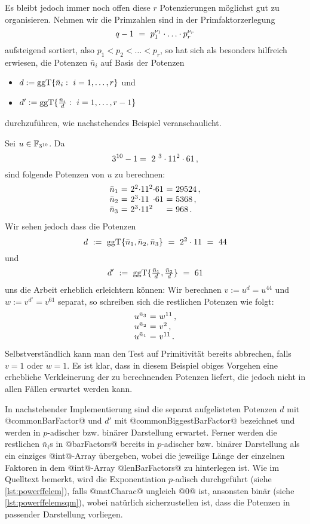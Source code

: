 Es bleibt jedoch immer noch offen diese $r$ Potenzierungen möglichst gut
zu organisieren. Nehmen wir die Primzahlen sind in der Primfaktorzerlegung
\[ q-1 \ =\  p_1^{\nu_1}\cdot\ldots\cdot p_r^{\nu_r}\]
aufsteigend sortiert, also $p_1<p_2<\ldots < p_r$, so
hat sich als besonders hilfreich erwiesen, die Potenzen $\bar n_i$ auf
Basis der Potenzen
\begin{itemize}
  \item $d := \ggT\{ \bar n_i:\ i=1,\ldots,r\}$ und 
  \item $d' := \ggT\{ \frac{\bar n_i}{d}:\ i=1,\ldots,r-1\}$
\end{itemize}
durchzuführen, wie nachstehendes Beispiel veranschaulicht.

\begin{beispiel}
  Sei $u \in \mathbb{F}_{3^{10}}$. Da
  \[ 3^{10}-1 = \ 2\ ^{3} \cdot 11^{2} \cdot 61 \,,\]
  sind folgende Potenzen von $u$ zu berechnen:
  \[ \begin{array}{l@{\ =\ }l@{}l@{}l@{\ =\ }l}
    \bar n_1 & 2^2 \cdot & 11^2 & \cdot 61 & 29524\,,\\
    \bar n_2 & 2^3 \cdot & 11 & \cdot 61 & 5368\,,\\
    \bar n_3 & 2^3 \cdot & 11^2 && 968\,. \end{array} \]
  Wir sehen jedoch dass die Potenzen
  \[ d \ :=\  \operatorname{ggT}\{ \bar n_1,\bar n_2,\bar n_3\} 
    \ =\  2^2\cdot 11 \ =\  44 \]
  und 
  \[ d' \ :=\  \operatorname{ggT}\{ \tfrac{\bar n_1}{d},\tfrac{\bar n_2}{d}\} \ =\  61\]
  uns die Arbeit erheblich erleichtern können:
  Wir berechnen $v := u^d = u^{44}$ und 
  $w := v^{d'} = v^{61}$ separat, so schreiben sich die restlichen Potenzen wie
  folgt:
  \[ \begin{array}{l@{\ =\ }l}
    u^{\bar n_3} & w^{11}\,, \\
    u^{\bar n_2} & v^2\,, \\
    u^{\bar n_1} & v^{11}\,.
  \end{array} \]
  Selbstverständlich kann man den Test auf Primitivität bereits abbrechen,
  falls $v = 1$ oder $w = 1$.
  Es ist klar, dass in diesem Beispiel obiges Vorgehen eine erhebliche
  Verkleinerung der zu berechnenden Potenzen liefert, die jedoch nicht in allen
  Fällen erwartet werden kann.
\end{beispiel}


In nachstehender Implementierung sind die separat aufgelisteten Potenzen $d$
mit @commonBarFactor@ und $d'$ mit @commonBiggestBarFactor@ bezeichnet und
werden in $p$-adischer bzw. binärer Darstellung erwartet.  Ferner
werden die restlichen $\bar n_i$s in @barFactors@ bereits in 
$p$-adischer bzw. binärer Darstellung als ein einziges @int@-Array übergeben, 
wobei die jeweilige Länge der einzelnen Faktoren in dem @int@-Array
@lenBarFactors@ zu hinterlegen ist. Wie im Quelltext bemerkt, wird 
die Exponentiation $p$-adisch durchgeführt (siehe \autoref{lst:powerffelem}),
falls @matCharac@ ungleich @0@ ist, ansonsten binär 
(siehe \autoref{lst:powerffelemsqm}), wobei natürlich sicherzustellen ist, dass
die Potenzen in passender Darstellung vorliegen.

